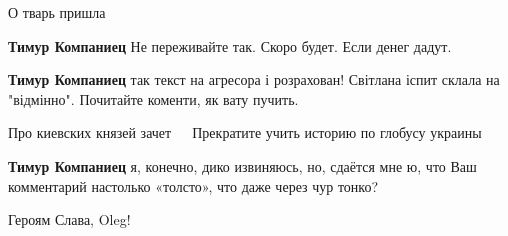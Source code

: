 \begin{itemize}
\begin{itemize}
 
О тварь пришла

 
\textbf{Тимур Компаниец}
Не переживайте так. Скоро будет. Если денег дадут.

 
\textbf{Тимур Компаниец} так текст на агресора і розрахован! Світлана іспит склала на "відмінно". Почитайте коменти, як вату пучить.

 
Про киевских князей зачет 🤣🤣🤣 Прекратите учить историю по глобусу украины

 
\textbf{Тимур Компаниец} я, конечно, дико извиняюсь, но, сдаётся мне ю, что Ваш комментарий настолько «толсто», что даже через чур тонко?
\Smiley[1.0][yellow]

 
Героям Слава, Oleg!

 

\end{itemize}
\end{itemize}
